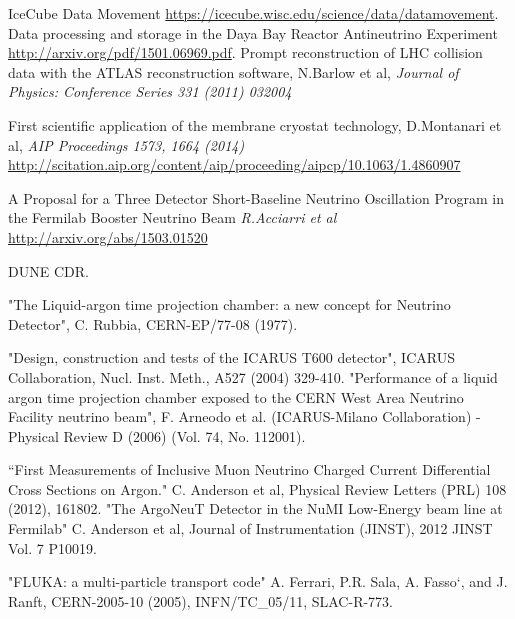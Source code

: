 \begin{thebibliography}{99}
 IceCube Data Movement \url{https://icecube.wisc.edu/science/data/datamovement}.
Data processing and storage in the Daya Bay Reactor Antineutrino Experiment \url{http://arxiv.org/pdf/1501.06969.pdf}.
 Prompt reconstruction of LHC collision data with the ATLAS reconstruction software, N.Barlow et al, \textit{Journal of Physics: Conference Series 331 (2011) 032004}

 First scientific application of the membrane cryostat technology, D.Montanari et al, \textit{AIP Proceedings 1573, 1664 (2014)} \url{http://scitation.aip.org/content/aip/proceeding/aipcp/10.1063/1.4860907}

  A Proposal for a Three Detector Short-Baseline Neutrino Oscillation Program in the Fermilab Booster Neutrino Beam \textit{R.Acciarri et al} \url{http://arxiv.org/abs/1503.01520}
 

 DUNE CDR.

"The Liquid-argon time projection chamber: a new concept for Neutrino Detector", C. Rubbia, CERN-EP/77-08 (1977).


 "Design, construction and tests of the ICARUS T600 detector", ICARUS Collaboration, Nucl. Inst. Meth., A527 (2004) 329-410. 
"Performance of a liquid argon time projection chamber exposed to the CERN West Area Neutrino Facility neutrino beam", F. Arneodo et al. (ICARUS-Milano Collaboration) - Physical Review D (2006) (Vol. 74, No. 112001). 

 ``First Measurements of Inclusive Muon Neutrino Charged Current Differential Cross Sections on Argon." C. Anderson et al, Physical Review Letters (PRL) 108 (2012), 161802. 
 "The ArgoNeuT Detector in the NuMI Low-Energy beam line at Fermilab" C. Anderson et al, Journal of Instrumentation (JINST), 2012 JINST Vol. 7 P10019. 

 "FLUKA: a multi-particle transport code" A. Ferrari, P.R. Sala, A. Fasso`, and J. Ranft, CERN-2005-10 (2005), INFN/TC\_05/11, SLAC-R-773.


\end{thebibliography}
